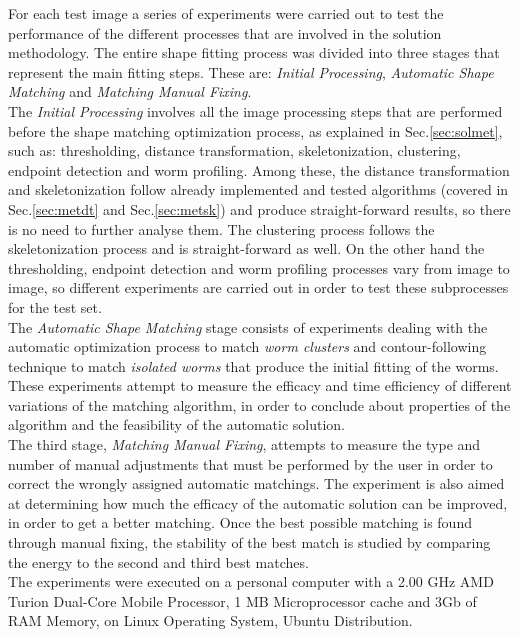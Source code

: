For each test image a series of experiments were carried out to test the performance of
the different processes that are involved in the solution methodology. The entire 
shape fitting process was divided into three stages that represent the 
main fitting steps. These are: \emph{Initial Processing}, \emph{Automatic Shape Matching} and
\emph{Matching Manual Fixing}.\\

The \emph{Initial Processing} involves all the image processing steps that are performed 
before the shape matching optimization process, as explained in Sec.\ref{sec:solmet},
such as: thresholding, distance transformation, skeletonization, 
clustering, endpoint detection and worm profiling. Among these, the distance transformation
and skeletonization follow already implemented and tested algorithms (covered in Sec.\ref{sec:metdt}
and Sec.\ref{sec:metsk}) and produce straight-forward results, so there is no need to further analyse them.
The clustering process follows the skeletonization process and is straight-forward as well.
On the other hand the thresholding, endpoint detection and worm profiling processes vary 
from image to image, so different experiments are carried out in order to test these subprocesses
for the test set.\\

The \emph{Automatic Shape Matching} stage consists of experiments dealing with the automatic
optimization process to match \emph{worm clusters} and contour-following technique to match 
\emph{isolated worms} that produce the initial fitting of the worms. These 
experiments attempt to measure the efficacy and time efficiency of different variations of the
matching algorithm, in order to conclude about properties of the algorithm and the feasibility 
of the automatic solution.\\
The third stage, \emph{Matching Manual Fixing}, attempts to measure the type and number of 
manual adjustments that must be performed by the user in order to correct the 
wrongly assigned automatic matchings. The experiment is also 
aimed at determining how much the efficacy of the automatic solution can be improved, in
order to get a better matching. Once the best possible matching is found through manual fixing,
the stability of the best match is studied by comparing the energy to the second and third best
matches.\\

The experiments were executed on a personal computer with a 2.00 GHz AMD Turion 
Dual-Core Mobile Processor, 1 MB Microprocessor cache and 3Gb of RAM Memory, 
on Linux Operating System, Ubuntu Distribution.


